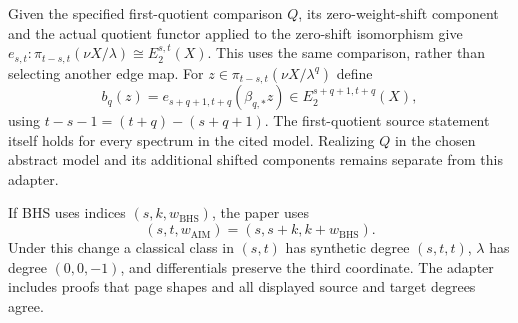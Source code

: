 \begin{definition}
  \label{def:first-lambda-quotient-comparison}
  \leanok
  Given the specified first-quotient comparison $Q$, its zero-weight-shift
  component and the actual quotient functor applied to the zero-shift
  isomorphism give
  $e_{s,t}:\pi_{t-s,t}(\nu X/\lambda)\cong E_2^{s,t}(X)$.
  This uses the same comparison, rather than selecting another edge map.
  For $z\in\pi_{t-s,t}(\nu X/\lambda^q)$ define
  \[
    b_q(z)=e_{s+q+1,t+q}(\beta_{q,*}z)
      \in E_2^{s+q+1,t+q}(X),
  \]
  using $t-s-1=(t+q)-(s+q+1)$.
  The first-quotient source statement itself holds for every spectrum in
  the cited model. Realizing $Q$ in the chosen abstract model and its
  additional shifted components remains separate from this adapter.
\end{definition}

\begin{definition}
  \label{def:bhs-aim-regrading}
  \notready
  If BHS uses indices $(s,k,w_{\mathrm{BHS}})$, the paper uses
  \[
    (s,t,w_{\mathrm{AIM}})=(s,s+k,k+w_{\mathrm{BHS}}).
  \]
  Under this change a classical class in $(s,t)$ has synthetic degree
  $(s,t,t)$, $\lambda$ has degree $(0,0,-1)$, and differentials preserve the
  third coordinate.  The adapter includes proofs that page shapes and all
  displayed source and target degrees agree.
\end{definition}


